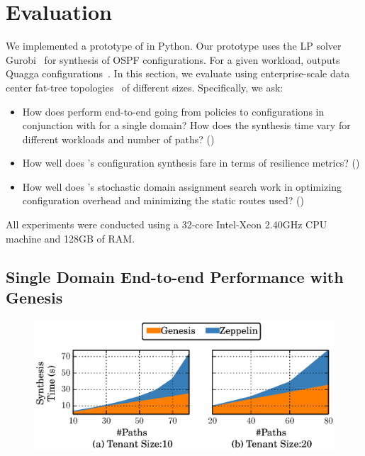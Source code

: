 \section{Evaluation}
 \label{sec:evaluation}
 
 We implemented a prototype of \name in Python. Our prototype uses the
 LP solver Gurobi~\cite{gurobi} for synthesis of OSPF configurations.
 For a given workload, \name outputs Quagga configurations~\cite{quagga}.  In this section, we evaluate \Name using
enterprise-scale data
center fat-tree topologies~\cite{fattree} of different 
sizes. 
Specifically, we ask:
\begin{itemize}
	\item How does \name perform end-to-end going from policies to
	configurations in conjunction with \genesis for a single domain? 
	How does the synthesis time vary for different workloads and number 
	of paths? ()
	
	\item How well does \name's configuration 
	synthesis fare in terms of resilience metrics? ()
	
	\item How well does \name's stochastic domain assignment 
	search work in optimizing configuration overhead
	and minimizing the static routes used? ()
\end{itemize}
All experiments were conducted using a
32-core Intel-Xeon 2.40GHz CPU machine and
128GB of RAM.

\subsection{Single Domain End-to-end Performance with Genesis}\label{sec:ospfeval}

\begin{figure}
	\includegraphics[width=0.58\columnwidth]{figures/ospfisolation.eps}
	\vspace{-8pt}
\end{figure}

